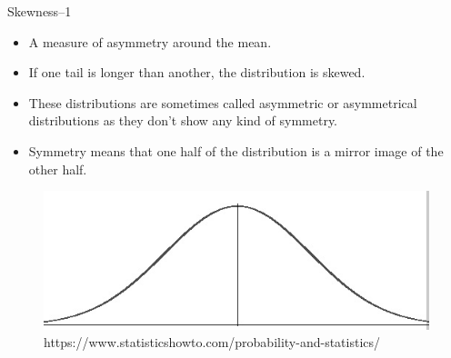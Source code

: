 \documentclass[10pt,dvipsnames, aspectratio=169]{beamer}
\begin{document}
\begin{frame}[t]{Skewness--1}
	\begin{itemize}
		\item A measure of asymmetry around the mean.
		\item If one tail is longer than another, the distribution is skewed.
		\item These distributions are sometimes called asymmetric or 
		asymmetrical distributions as they don’t show any kind of symmetry.
		\item Symmetry means that one half of the distribution is a mirror 
		image of the other half.
	\end{itemize}
	\begin{figure} [ht]
		\centering
		\includegraphics[trim={0 0 0.1cm 0}, clip, 
		scale=0.5]{eda/normal-distribution-probability.jpg}
		\caption{https://www.statisticshowto.com/probability-and-statistics/}
	\end{figure}
\end{frame}
\end{document}
